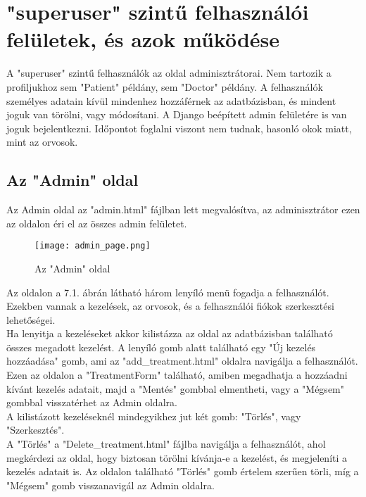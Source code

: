 \chapter{"superuser" szintű felhasználói felületek, és azok működése}
\label{chap:fejezet7}

A "superuser" szintű felhasználók az oldal adminisztrátorai. Nem tartozik a profiljukhoz sem "Patient" példány, sem "Doctor" példány. A felhasználók személyes adatain kívül mindenhez hozzáférnek az adatbázisban, és mindent joguk van törölni, vagy módosítani. A Django beépített admin felületére is van joguk bejelentkezni. Időpontot foglalni viszont nem tudnak, hasonló okok miatt, mint az orvosok.

\section{Az "Admin" oldal}

Az Admin oldal az "admin.html" fájlban lett megvalósítva, az adminisztrátor ezen az oldalon éri el az összes admin felületet.\\

\begin{figure}[H]
	\caption{Az "Admin" oldal}
	\label{fig:adminpage}
	\centering
	\texttt{[image: admin\_page.png]}
\end{figure}

Az oldalon a 7.1. ábrán látható három lenyíló menü fogadja a felhasználót. Ezekben vannak a kezelések, az orvosok, és a felhasználói fiókok szerkesztési lehetőségei.\\

Ha lenyitja a kezeléseket akkor kilistázza az oldal az adatbázisban található összes megadott kezelést. A lenyíló gomb alatt található egy "Új kezelés hozzáadása" gomb, ami az "add\_treatment.html" oldalra navigálja a felhasználót. Ezen az oldalon a "TreatmentForm" található, amiben megadhatja a hozzáadni kívánt kezelés adatait, majd a "Mentés" gombbal elmentheti, vagy a "Mégsem" gombbal visszatérhet az Admin oldalra.\\

A kilistázott kezeléseknél mindegyikhez jut két gomb: "Törlés", vagy "Szerkesztés".\\

A "Törlés" a "Delete\_treatment.html" fájlba navigálja a felhasználót, ahol megkérdezi az oldal, hogy biztosan törölni kívánja-e a kezelést, és megjeleníti a kezelés adatait is. Az oldalon található "Törlés" gomb értelem szerűen törli, míg a "Mégsem" gomb visszanavigál az Admin oldalra.\\

